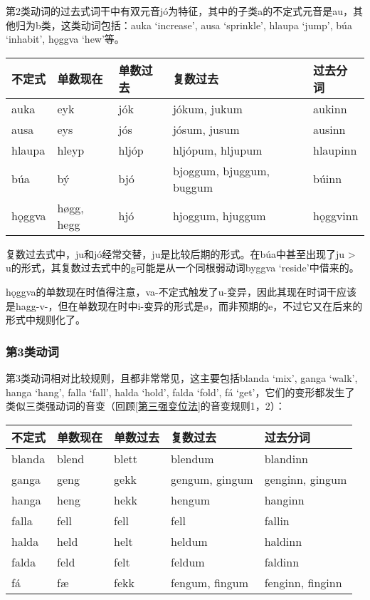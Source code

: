 第2类动词的过去式词干中有双元音jó为特征，其中的子类a的不定式元音是au，其他归为b类，这类动词包括：auka `increase', ausa `sprinkle', hlaupa `jump', búa `inhabit', hǫggva `hew‌'等。

\begin{longtable}{lllll}
    \toprule
    不定式 & 单数现在   & 单数过去 & 复数过去                 & 过去分词 \\
    \midrule
    \endhead
    \bottomrule
    \endfoot
    auka   & eyk        & jók      & jókum, jukum             & aukinn   \\
    ausa   & eys        & jós      & jósum, jusum             & ausinn   \\
    hlaupa & hleyp      & hljóp    & hljópum, hljupum         & hlaupinn \\
    búa    & bý         & bjó      & bjoggum, bjuggum, buggum & búinn    \\
    hǫggva & høgg, hegg & hjó      & hjoggum, hjuggum         & hǫggvinn \\
\end{longtable}

复数过去式中，ju和jó经常交替，ju是比较后期的形式。在búa中甚至出现了ju > u的形式，其复数过去式中的g可能是从一个同根弱动词byggva
`reside'中借来的。

hǫggva的单数现在时值得注意，va-不定式触发了u-变异，因此其现在时词干应该是hagg-v-，但在单数现在时中i-变异的形式是ø，而非预期的e，不过它又在后来的形式中规则化了。

\subsubsection{第3类动词}

第3类动词相对比较规则，且都非常常见，这主要包括blanda `mix', ganga
`walk', hanga `hang', falla `fall', halda `hold', falda `fold', fá `get'，它们的变形都发生了类似三类强动词的音变（回顾\ref{第三强变位法}的音变规则1，2）：

\begin{longtable}{lllll}
    \toprule
    不定式 & 单数现在 & 单数过去 & 复数过去       & 过去分词         \\
    \midrule
    \endhead
    \bottomrule
    \endfoot
    blanda & blend    & blett    & blendum        & blandinn         \\
    ganga  & geng     & gekk     & gengum, gingum & genginn, gingum  \\
    hanga  & heng     & hekk     & hengum         & hanginn          \\
    falla  & fell     & fell     & fell           & fallin           \\
    halda  & held     & helt     & heldum         & haldinn          \\
    falda  & feld     & felt     & feldum         & faldinn          \\
    fá     & fæ       & fekk     & fengum, fingum & fenginn, finginn \\
\end{longtable}


